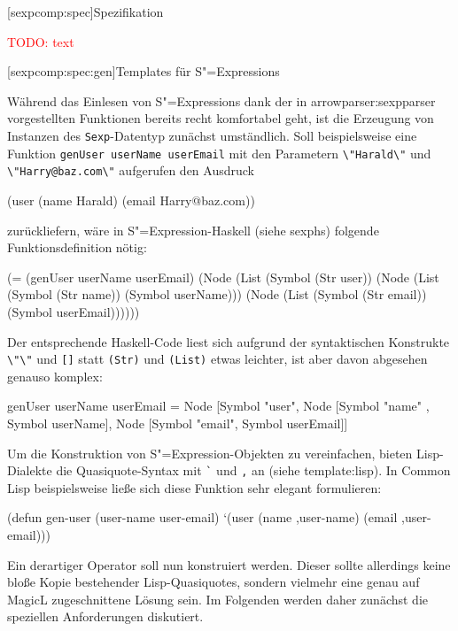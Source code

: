 \documentclass[11pt, a4paper, bibgerm]{scrbook}
\newenvironment{DIFnomarkup}{}{}
\newcommand\icode[1]{\lstinline?#1?}
\newcommand{\todo}[1]{
  \textcolor{red}{TODO: #1}
}
\newcommand\lsection{}
\newcommand\lsubsection{}
\newcommand\cref{}
\newcommand\sref{}
\newcommand{\seec}[1]{(siehe \cref{#1})}
\newcommand{\sees}[1]{(siehe \sref{#1})}
\newcommand{\sexp}{S"=Expression}
\newcommand{\sexps}{S"=Expressions}
\begin{document}
\lsection[sexpcomp:spec]{Spezifikation}

\todo{text}

\lsubsection[sexpcomp:spec:gen]{Templates für \sexps}

Während das Einlesen von \sexps{} dank der in
\sref{arrowparser:sexpparser} vorgestellten Funktionen bereits recht
komfortabel geht, ist die Erzeugung von Instanzen des
\icode{Sexp}-Datentyp zunächst umständlich. Soll beispielsweise eine
Funktion \icode{genUser userName userEmail} mit den Parametern
\icode{\"Harald\"} und \icode{\"Harry@baz.com\"} aufgerufen den Ausdruck
\begin{DIFnomarkup}\begin{code}
(user (name Harald) (email Harry@baz.com))
\end{code}\end{DIFnomarkup}
zurückliefern, wäre
in \sexp{}-Haskell \seec{sexphs} folgende Funktionsdefinition
nötig:
\begin{DIFnomarkup}\begin{code}
(= (genUser userName userEmail)
   (Node (List (Symbol (Str user))
               (Node (List (Symbol (Str  name)) (Symbol userName)))
               (Node (List (Symbol (Str email)) (Symbol userEmail))))))
\end{code}\end{DIFnomarkup}
Der entsprechende Haskell-Code liest sich aufgrund der syntaktischen
Konstrukte \icode{\"\"} und \icode{[]} statt \icode{(Str)} und
\icode{(List)} etwas leichter, ist aber davon abgesehen genauso komplex:
\begin{DIFnomarkup}\begin{code}
genUser userName userEmail =
   Node [Symbol "user",
         Node [Symbol "name" , Symbol userName],
         Node [Symbol "email", Symbol userEmail]]
\end{code}\end{DIFnomarkup}
Um die Konstruktion von \sexp{}-Objekten zu vereinfachen, bieten
Lisp-Dialekte die Quasiquote-Syntax mit \icode{`} und \icode{,} an
\sees{template:lisp}. In Common Lisp beispielsweise ließe sich diese
Funktion sehr elegant formulieren:
\begin{DIFnomarkup}\begin{code}
(defun gen-user (user-name user-email)
  `(user (name ,user-name) (email ,user-email)))
\end{code}\end{DIFnomarkup}
Ein derartiger Operator soll nun konstruiert werden. Dieser sollte
allerdings keine bloße Kopie bestehender Lisp-Quasiquotes, sondern
vielmehr eine genau auf MagicL zugeschnittene Lösung sein. Im Folgenden
werden daher zunächst die speziellen Anforderungen diskutiert.
\end{document}
